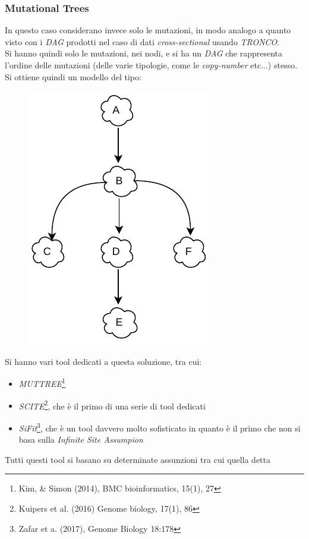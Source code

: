 \documentclass[a4paper,12pt, oneside]{book}
\begin{document}
\subsubsection{Mutational Trees}
In questo caso considerano invece solo le mutazioni, in modo analogo a quanto
visto con i \textit{DAG} prodotti nel caso di dati \textit{cross-sectional}
usando \textit{TRONCO}.\\
Si hanno quindi solo le mutazioni, nei nodi, e si ha un \textit{DAG} che
rappresenta l'ordine delle mutazioni (delle varie tipologie, come le
\textit{copy-number} etc$\ldots$) stesso. \\
Si ottiene quindi un modello del tipo:
\begin{figure}[H]
  \centering
  \includegraphics[scale = 0.9]{img/mt.pdf}
\end{figure}
Si hanno vari tool dedicati a questa soluzione, tra cui:
\begin{itemize}
  \item \textit{MUTTREE}\footnote{Kim, \& Simon (2014), BMC bioinformatics,
    15(1), 27} 
  \item \textit{SCITE}\footnote{Kuipers et al. (2016) Genome biology, 17(1),
    86}, che è il primo di una serie di tool dedicati
  \item \textit{SiFit}\footnote{Zafar et a. (2017), Genome Biology 18:178}, che
  è un tool davvero molto sofisticato in quanto è il primo che non si basa sulla
  \textit{Infinite Site Assumpion}
\end{itemize}
Tutti questi tool si basano su determinate assunzioni tra cui quella detta
\end{document}
